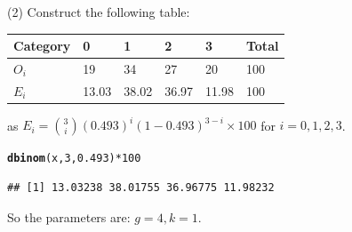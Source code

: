 \documentclass[t,xcolor=pdftex,dvipsnames,table]{beamer}
\makeatletter
\newcommand{\hlnum}[1]{\textcolor[rgb]{0.686,0.059,0.569}{#1}}%
\newcommand{\hlopt}[1]{\textcolor[rgb]{0,0,0}{#1}}%
\newcommand{\hlstd}[1]{\textcolor[rgb]{0.345,0.345,0.345}{#1}}%
\newcommand{\hlkwd}[1]{\textcolor[rgb]{0.737,0.353,0.396}{\textbf{#1}}}%
\newenvironment{kframe}{%
 \def\at@end@of@kframe{}%
 \ifinner\ifhmode%
  \def\at@end@of@kframe{\end{minipage}}%
  \begin{minipage}{\columnwidth}%
 \fi\fi%
 \def\FrameCommand##1{\hskip\@totalleftmargin \hskip-\fboxsep
 \colorbox{shadecolor}{##1}\hskip-\fboxsep
     \hskip-\linewidth \hskip-\@totalleftmargin \hskip\columnwidth}%
 \MakeFramed {\advance\hsize-\width
   \@totalleftmargin\z@ \linewidth\hsize
   \@setminipage}}%
 {\par\unskip\endMakeFramed%
 \at@end@of@kframe}
\newenvironment{knitrout}{}{} %
\makeatother
\begin{document}
\begin{frame}[fragile]{}
(2) Construct the following table:

\vspace{.5cm}
\begin{tabular}{l|llll|l} 
Category & 0 & 1 & 2 & 3 & Total  \\ \hline
$O_{i}$ & 19 & 34 & 27 & 20 & 100    \\ \hline
$E_{i}$ & 13.03 & 38.02 & 36.97 & 11.98 & 100    \\ \hline
\end{tabular}

\vspace{.5cm}
as $E_{i} = {3 \choose i} (0.493)^i (1-0.493)^{3-i} \times 100$ for $i=0,1,2,3$. 

\begin{knitrout}
\color{fgcolor}\begin{kframe}
\begin{alltt}
\hlkwd{dbinom}\hlstd{(x,}\hlnum{3}\hlstd{,}\hlnum{0.493}\hlstd{)}\hlopt{*}\hlnum{100}
\end{alltt}
\begin{verbatim}
## [1] 13.03238 38.01755 36.96775 11.98232
\end{verbatim}
\end{kframe}
\end{knitrout}

\vspace{.5cm}
So the parameters are: $g=4, k=1$.
\end{frame} 
\end{document}
